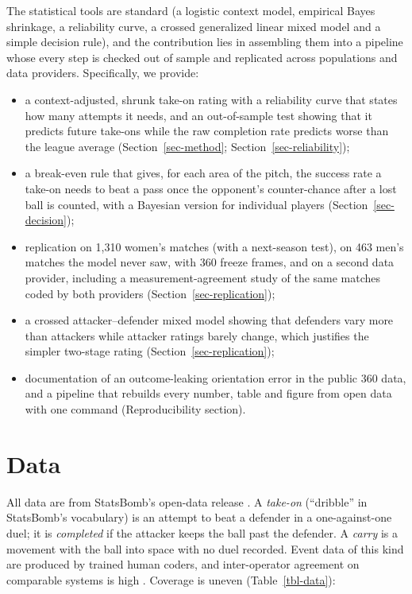 \documentclass[
  12pt]{article}
\providecommand{\tightlist}{%
  \setlength{\itemsep}{0pt}\setlength{\parskip}{0pt}}
\begin{document}
The statistical tools are standard (a logistic context model, empirical
Bayes shrinkage, a reliability curve, a crossed generalized linear mixed
model and a simple decision rule), and the contribution lies in
assembling them into a pipeline whose every step is checked out of
sample and replicated across populations and data providers.
Specifically, we provide:

\begin{itemize}
\tightlist
\item
  a context-adjusted, shrunk take-on rating with a reliability curve
  that states how many attempts it needs, and an out-of-sample test
  showing that it predicts future take-ons while the raw completion rate
  predicts worse than the league average (Section~\ref{sec-method};
  Section~\ref{sec-reliability});
\item
  a break-even rule that gives, for each area of the pitch, the success
  rate a take-on needs to beat a pass once the opponent's counter-chance
  after a lost ball is counted, with a Bayesian version for individual
  players (Section~\ref{sec-decision});
\item
  replication on 1,310 women's matches (with a next-season test), on 463
  men's matches the model never saw, with 360 freeze frames, and on a
  second data provider, including a measurement-agreement study of the
  same matches coded by both providers (Section~\ref{sec-replication});
\item
  a crossed attacker--defender mixed model showing that defenders vary
  more than attackers while attacker ratings barely change, which
  justifies the simpler two-stage rating
  (Section~\ref{sec-replication});
\item
  documentation of an outcome-leaking orientation error in the public
  360 data, and a pipeline that rebuilds every number, table and figure
  from open data with one command (Reproducibility section).
\end{itemize}

\section{Data}\label{sec-data}

All data are from StatsBomb's open-data release \citep{statsbomb}. A
\emph{take-on} (``dribble'' in StatsBomb's vocabulary) is an attempt to
beat a defender in a one-against-one duel; it is \emph{completed} if the
attacker keeps the ball past the defender. A \emph{carry} is a movement
with the ball into space with no duel recorded. Event data of this kind
are produced by trained human coders, and inter-operator agreement on
comparable systems is high \citep{liu2013}. Coverage is uneven
(Table~\ref{tbl-data}):
\end{document}
